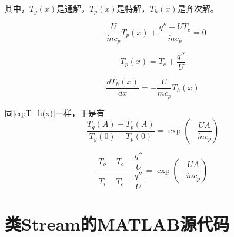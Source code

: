 其中，$T_{g}(x)$是通解，$T_{p}(x)$是特解，$T_{h}(x)$是齐次解。

\begin{equation}
-\frac{U}{\dot{m}c_{p}}T_{p}(x)+\frac{q''+UT_{c}}{\dot{m}c_{p}}=0
\end{equation}

\begin{equation}
T_{p}(x)=T_{c}+\frac{q''}{U}
\end{equation}

\begin{equation}
\frac{dT_{h}(x)}{dx}=-\frac{U}{\dot{m}c_{p}}T_{h}(x)
\end{equation}

同\autoref{eq:T_h(x)}一样，于是有
\begin{equation}
\frac{T_{g}(A)-T_{p}(A)}{T_{g}(0)-T_{p}(0)}=\exp(-\frac{UA}{\dot{m}c_{p}})
\end{equation}

\begin{equation}
\frac{T_{o}-T_{c}-\dfrac{q''}{U}}{T_{i}-T_{c}-\dfrac{q''}{U}}=\exp(-\frac{UA}{\dot{m}c_{p}})
\end{equation}

\chapter{类Stream的MATLAB源代码}
\label{cha:MATLAB_SOURCECODE}


